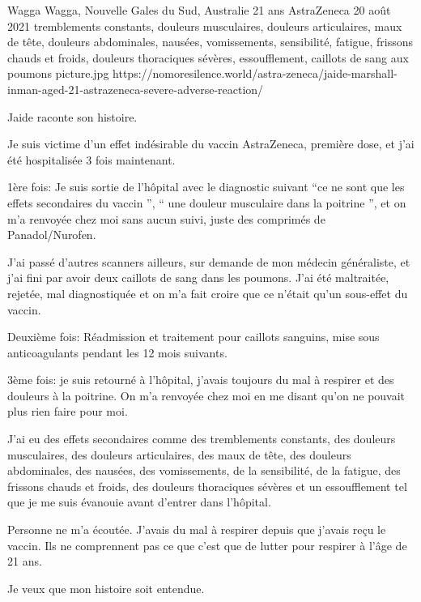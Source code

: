 {Wagga Wagga, Nouvelle Gales du Sud, Australie}
{21 ans}
{AstraZeneca}
{20 août 2021}
{tremblements constants, douleurs musculaires, douleurs articulaires, maux de
  tête, douleurs abdominales, nausées, vomissements, sensibilité, fatigue,
  frissons chauds et froids, douleurs thoraciques sévères, essoufflement,
  caillots de sang aux poumons}
{picture.jpg}
{https://nomoresilence.world/astra-zeneca/jaide-marshall-inman-aged-21-astrazeneca-severe-adverse-reaction/}
{

Jaide raconte son histoire.

Je suis victime d'un effet indésirable du vaccin AstraZeneca, première dose, et
j'ai été hospitalisée 3 fois maintenant.

1ère fois: Je suis sortie de l'hôpital avec le diagnostic suivant “ce ne sont
que les effets secondaires du vaccin ”, “ une douleur musculaire dans la
poitrine ”, et on m'a renvoyée chez moi sans aucun suivi, juste des comprimés de
Panadol/Nurofen.

J'ai passé d'autres scanners ailleurs, sur demande de mon médecin généraliste,
et j'ai fini par avoir deux caillots de sang dans les poumons. J'ai été
maltraitée, rejetée, mal diagnostiquée et on m'a fait croire que ce n'était
qu'un sous-effet du vaccin.

Deuxième fois: Réadmission et traitement pour caillots sanguins, mise sous
anticoagulants pendant les 12 mois suivants.

3ème fois: je suis retourné à l'hôpital, j'avais toujours du mal à respirer et
des douleurs à la poitrine. On m'a renvoyée chez moi en me disant qu'on ne
pouvait plus rien faire pour moi.

J'ai eu des effets secondaires comme des tremblements constants, des douleurs
musculaires, des douleurs articulaires, des maux de tête, des douleurs
abdominales, des nausées, des vomissements, de la sensibilité, de la fatigue,
des frissons chauds et froids, des douleurs thoraciques sévères et un
essoufflement tel que je me suis évanouie avant d'entrer dans l'hôpital.

Personne ne m'a écoutée. J'avais du mal à respirer depuis que j'avais reçu le
vaccin. Ils ne comprennent pas ce que c'est que de lutter pour respirer à l'âge
de 21 ans.

Je veux que mon histoire soit entendue.

}
